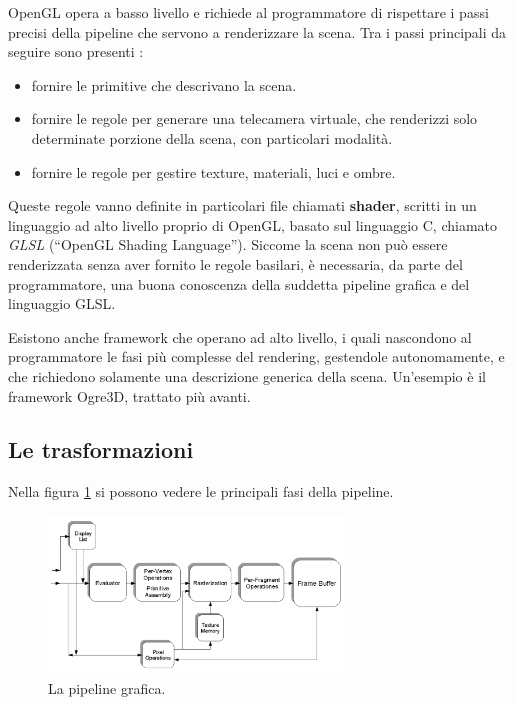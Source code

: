 OpenGL opera a basso livello e richiede al programmatore di rispettare i passi precisi della pipeline che servono a renderizzare la scena. Tra i passi principali da seguire sono presenti :

\begin{itemize}
\item fornire le primitive che descrivano la scena.
\item fornire le regole per generare una telecamera virtuale, che renderizzi solo determinate porzione della scena, con particolari modalità.
\item fornire le regole per gestire texture, materiali, luci e ombre.
\end{itemize}

Queste regole vanno definite in particolari file chiamati \textbf{shader}, scritti in un linguaggio ad alto livello proprio di OpenGL, basato sul linguaggio C, chiamato \textit{GLSL} (“OpenGL Shading Language”). Siccome la scena non può essere renderizzata senza aver fornito le regole basilari, è necessaria, da parte del programmatore, una buona conoscenza della suddetta pipeline grafica e del linguaggio GLSL.

Esistono anche framework che operano ad alto livello, i quali nascondono al programmatore le fasi più complesse del rendering, gestendole autonomamente, e che richiedono solamente una descrizione generica della scena. Un'esempio è il framework Ogre3D, trattato più avanti.

\subsection{Le trasformazioni}

Nella figura \ref{pipeline} si possono vedere le principali fasi della pipeline.

\begin{figure}[htbp]
\centering
\includegraphics[width=0.7\textwidth]{images/frustum/opengl-pipeline.png}
\caption{La pipeline grafica.\label{pipeline}}
\end{figure}

